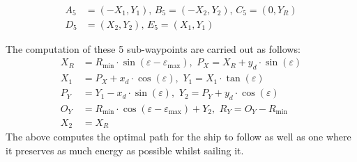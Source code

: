 \documentclass[a0,portrait]{a0poster}
\begin{document}
\begin{center}
{\paragraph{}
\begin{align}
A_5 &= (-X_1,Y_1),\, B_5 = (-X_2,Y_2),\, C_5 = (0,Y_R)\\
D_5 &= (X_2,Y_2),\, E_5 = (X_1,Y_1)
\end{align}

The computation of these 5 sub-waypoints are carried out as follows:
\begin{align}
X_R &= R_\text{min} \cdot \sin(\varepsilon - \varepsilon _\text{max}),\,\, P_X = X_R + y_d \cdot \sin(\varepsilon)\\
X_1 &= P_X + x_d \cdot \cos(\varepsilon),\,\, Y_1 = X_1 \cdot \tan(\varepsilon)\\
P_Y &= Y_1 - x_d \cdot \sin(\varepsilon),\,\, Y_2 = P_Y + y_d \cdot \cos(\varepsilon)\\
O_Y &= R_\text{min} \cdot \cos(\varepsilon - \varepsilon _\text{max}) + Y_2,\,\, R_Y = O_Y - R_\text{min}\\
X_2 &= X_R
\end{align}
The above computes the optimal path for the ship to follow as well as one where it preserves as much energy as possible whilst sailing it. 

}
\end{center}
\end{document}
